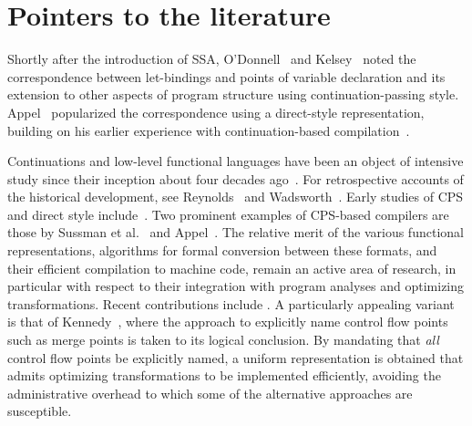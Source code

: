 


\section{Pointers to the literature}
\label{section:Part1:Semantics:Literature}



Shortly after the introduction of SSA, O'Donnell~\cite{ODonnellPhD}
and Kelsey~\cite{Kelsey95} noted the correspondence between
let-bindings and points of variable declaration and its extension to
other aspects of program structure using
continuation-passing style. Appel~\cite{Appel98:SSA,Appel:MCIML} popularized
the correspondence using a direct-style representation, building on
his earlier experience with continuation-based
compilation~\cite{Appel:CWC}. 

Continuations and low-level functional languages have been an object
of intensive study since their inception about four decades
ago~\cite{vanWijngaarden1966,Landin1965}.  For retrospective accounts
of the historical development, see Reynolds~\cite{Reynolds:LSC1993}
and Wadsworth~\cite{Wadsworth00}. Early studies of CPS and direct
style include~\cite{Reynolds:1972,Reynolds1974,Plotkin75}.  Two
prominent examples of CPS-based compilers are those by Sussman et
al.~\cite{DBLP:journals/lisp/SussmanS98a} and Appel~\cite{Appel:CWC}.
The relative merit of the various functional representations,
algorithms for formal conversion between these formats, and their
efficient compilation to machine code, remain an active area of
research, in particular with respect to their integration with program
analyses and optimizing transformations.  Recent contributions include
\cite{DBLP:journals/jfp/DanvyMN07,DBLP:journals/lisp/Reppy02,DBLP:conf/icfp/Kennedy07}. 
A particularly appealing variant is that of
Kennedy~\cite{DBLP:conf/icfp/Kennedy07}, where the approach to
explicitly name control flow points such as merge points is taken to
its logical conclusion. By mandating that \emph{all} control flow
points be explicitly named, a uniform representation is obtained that
admits optimizing transformations to be implemented efficiently,
avoiding the administrative overhead to which some of the alternative
approaches are susceptible.

